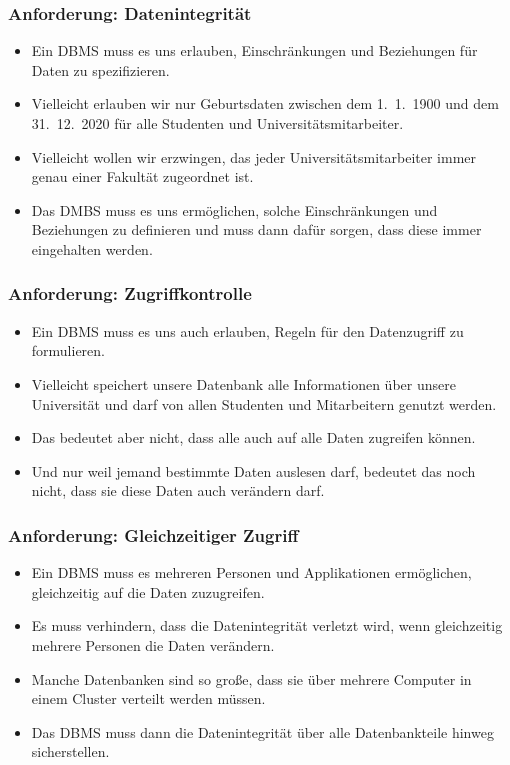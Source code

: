 \documentclass[aspectratio=169,mathserif,notheorems]{beamer}%
\begin{document}
%
\begin{frame}%
\frametitle{Anforderung: Datenintegrität}%
\begin{itemize}%
\item Ein DBMS muss es uns erlauben, Einschränkungen und Beziehungen für Daten zu spezifizieren.%
\item<2-> Vielleicht erlauben wir nur Geburtsdaten zwischen dem 1.~1.~1900 und dem 31.~12.~2020 für alle Studenten und Universitätsmitarbeiter.%
\item<3-> Vielleicht wollen wir erzwingen, das jeder Universitätsmitarbeiter immer genau einer Fakultät zugeordnet ist.%
\item<4-> Das DMBS muss es uns ermöglichen, solche Einschränkungen und Beziehungen zu definieren und muss dann dafür sorgen, dass diese immer eingehalten werden.
\end{itemize}%
\end{frame}%
%
\begin{frame}%
\frametitle{Anforderung: Zugriffkontrolle}%
\begin{itemize}%
\item Ein DBMS muss es uns auch erlauben, Regeln für den Datenzugriff zu formulieren.%
\item<2-> Vielleicht speichert unsere Datenbank alle Informationen über unsere Universität und darf von allen Studenten und Mitarbeitern genutzt werden.%
\item<3-> Das bedeutet aber nicht, dass alle auch auf alle Daten zugreifen können.%
\item<4-> Und nur weil jemand bestimmte Daten auslesen darf, bedeutet das noch nicht, dass sie diese Daten auch verändern darf.%
\end{itemize}%
\end{frame}%
%
\begin{frame}%
\frametitle{Anforderung: Gleichzeitiger Zugriff}%
\begin{itemize}%
\item Ein DBMS muss es mehreren Personen und Applikationen ermöglichen, gleichzeitig auf die Daten zuzugreifen.%
\item<2-> Es muss verhindern, dass die Datenintegrität verletzt wird, wenn gleichzeitig mehrere Personen die Daten verändern.%
\item<3-> Manche Datenbanken sind so große, dass sie über mehrere Computer in einem Cluster verteilt werden müssen.%
\item<4-> Das DBMS muss dann die Datenintegrität über alle Datenbankteile hinweg sicherstellen.%
\end{itemize}%
\end{frame}%
\end{document}
